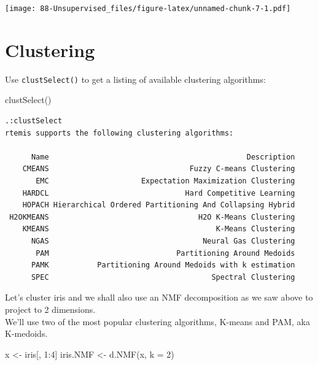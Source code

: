 \documentclass[
]{book}
\newenvironment{Shaded}{\begin{snugshade}}{\end{snugshade}}
\newcommand{\AttributeTok}[1]{\textcolor[rgb]{0.77,0.63,0.00}{#1}}
\newcommand{\DecValTok}[1]{\textcolor[rgb]{0.00,0.00,0.81}{#1}}
\newcommand{\FunctionTok}[1]{\textcolor[rgb]{0.00,0.00,0.00}{#1}}
\newcommand{\NormalTok}[1]{#1}
\newcommand{\OtherTok}[1]{\textcolor[rgb]{0.56,0.35,0.01}{#1}}
\newcommand{\SpecialCharTok}[1]{\textcolor[rgb]{0.00,0.00,0.00}{#1}}
\begin{document}
\texttt{[image: 88-Unsupervised\_files/figure-latex/unnamed-chunk-7-1.pdf]}

\hypertarget{clustering}{%
\section{Clustering}\label{clustering}}

Use \texttt{clustSelect()} to get a listing of available clustering algorithms:

\begin{Shaded}
\begin{Highlighting}[]
\FunctionTok{clustSelect}\NormalTok{()}
\end{Highlighting}
\end{Shaded}

\begin{verbatim}
.:clustSelect
rtemis supports the following clustering algorithms:

      Name                                             Description
    CMEANS                                Fuzzy C-means Clustering
       EMC                     Expectation Maximization Clustering
    HARDCL                               Hard Competitive Learning
    HOPACH Hierarchical Ordered Partitioning And Collapsing Hybrid
 H2OKMEANS                                  H2O K-Means Clustering
    KMEANS                                      K-Means Clustering
      NGAS                                   Neural Gas Clustering
       PAM                             Partitioning Around Medoids
      PAMK           Partitioning Around Medoids with k estimation
      SPEC                                     Spectral Clustering
\end{verbatim}

Let's cluster iris and we shall also use an NMF decomposition as we saw above to project to 2 dimensions.\\
We'll use two of the most popular clustering algorithms, K-means and PAM, aka K-medoids.

\begin{Shaded}
\begin{Highlighting}[]
\NormalTok{x }\OtherTok{\textless{}{-}}\NormalTok{ iris[, }\DecValTok{1}\SpecialCharTok{:}\DecValTok{4}\NormalTok{]}
\NormalTok{iris.NMF }\OtherTok{\textless{}{-}} \FunctionTok{d.NMF}\NormalTok{(x, }\AttributeTok{k =} \DecValTok{2}\NormalTok{)}
\end{Highlighting}
\end{Shaded}
\end{document}
